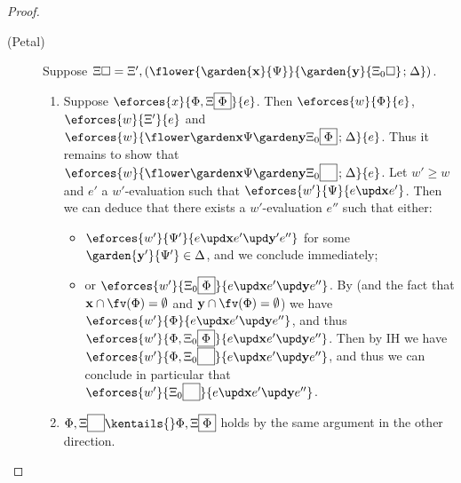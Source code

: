 \begin{scope}
\begin{proof}
\begin{description}
\begin{description}
        \item[(Petal)]
          \renewcommand{\FillXi}[1]{\Xi', (\flower{\garden{\bx}{\Psi}}{\garden{\by}{#1}
          \sep \Delta})}
          \renewcommand{\rFillXi}[1]{\flower{\garden{\bx}{\Psi}}{\garden{\by}{#1}
          \sep \Delta}}

          Suppose $\Xi\hole = \FillXi{\Xi_0\hole}$.
          \begin{enumerate}
            \item Suppose $\eforces{x}{\Phi, \ffillXi{\Phi}}{e}$. Then
            $\eforces{w}{\Phi}{e}$, $\eforces{w}{\Xi'}{e}$ and
            $\eforces{w}{\rfillXi{\Phi}}{e}$. Thus it remains to show that
            $\eforces{w}{\rfillXi{\phantom{\Phi}}}{e}$. Let $w' \geq w$ and $e'$
            a $w'$-evaluation such that
            $\eforces{w'}{\Psi}{\update{e}{\bx}{e'}}$. Then we can deduce
            that there exists a $w'$-evaluation $e''$ such that either:
            \begin{itemize}
              \item
              $\eforces{w'}{\Psi'}{\update{e}{\bx}{\update{e'}{\mathbf{y'}}{e''}}}$
              for some $\garden{\mathbf{y'}}{\Psi'} \in \Delta$, and we conclude
              immediately;
              \item
              or
              $\eforces{w'}{\Xi_0\select{\Phi}}{\update{e}{\bx}{\update{e'}{\by}{e''}}}$.
              By  (and the fact that $\bx \cap
              \fv(\Phi) = \emptyset$ and $\by \cap \fv(\Phi) =
              \emptyset$) we have
              $\eforces{w'}{\Phi}{\update{e}{\bx}{\update{e'}{\by}{e''}}}$,
              and thus $\eforces{w'}{\Phi,
              \Xi_0\select{\Phi}}{\update{e}{\bx}{\update{e'}{\by}{e''}}}$.
              Then by IH we have $\eforces{w'}{\Phi,
              \Xi_0\select{\phantom{\Phi}}}{\update{e}{\bx}{\update{e'}{\by}{e''}}}$,
              and thus we can conclude in particular that $\eforces{w'}{
              \Xi_0\select{\phantom{\Phi}}}{\update{e}{\bx}{\update{e'}{\by}{e''}}}$.
            \end{itemize}

            \item $\Phi, \ffillXi{\phantom{\Phi}} \kentails{}\Phi,
            \ffillXi{\Phi}$ holds by the same argument in the other direction.
          \end{enumerate}
      \end{description}
  \end{description}
\end{proof}


\end{scope}
